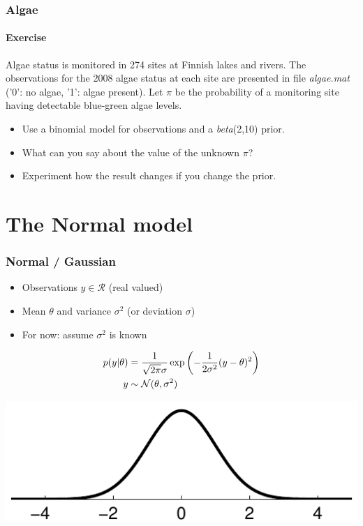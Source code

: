 \documentclass[10pt]{beamer}
\begin{document}
\begin{frame}
\frametitle{Algae}
\framesubtitle{Exercise}

Algae status is monitored in 274 sites at Finnish lakes and rivers.
The observations for the 2008 algae status at each site are presented
in file \emph{algae.mat} ('0': no algae, '1': algae present).
Let $\pi$ be the probability of a monitoring site having detectable
blue-green algae levels.

\begin{itemize}
\item Use a binomial model for observations and a \emph{beta}(2,10) prior.
\item What can you say about the value of the unknown $\pi$?
\item Experiment how the result changes if you change the prior.
\end{itemize}
\end{frame}

\section{The Normal model}

\begin{frame}
  \frametitle{Normal / Gaussian}

  \begin{itemize}
  \item Observations $y \in \mathcal{R}$ (real valued)
  \item Mean $\theta$ and variance $\sigma^2$ (or deviation $\sigma$)
  \item For now: assume $\sigma^2$ is known
  \end{itemize}
  \vskip -2mm
  \begin{align*}
    p(y|\theta)&=\frac{1}{\sqrt{2\pi}\sigma}\exp\left(-\frac{1}{2\sigma^2}(y-\theta)^2\right)\\
    y & \sim \mathcal{N}(\theta,\sigma^2)
  \end{align*}

  \begin{center}
      \includegraphics[clip]{figs/kuva2b_1}
  \end{center}
\end{frame}
\end{document}
